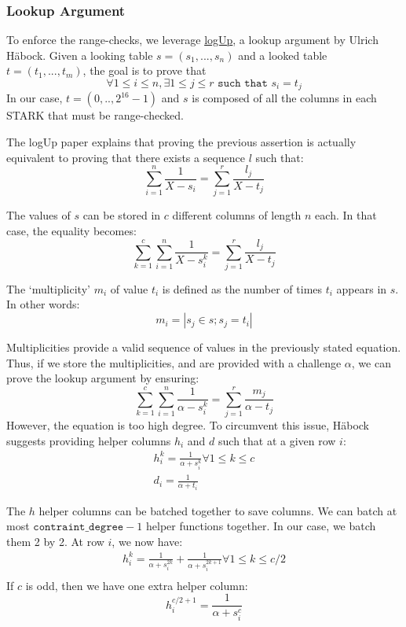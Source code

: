 \subsubsection{Lookup Argument}
To enforce the range-checks, we leverage \href{https://eprint.iacr.org/2022/1530.pdf}{logUp}, a lookup argument by Ulrich Häbock. Given a looking table $s = (s_1, ..., s_n)$ and a looked table $t = (t_1, ..., t_m)$, the goal is to prove that 
$$\forall 1 \leq i \leq n, \exists 1 \leq j \leq r \texttt{ such that } s_i = t_j$$
In our case, $t = (0, .., 2^{16} - 1)$ and $s$ is composed of all the columns in each STARK that must be range-checked. 

The logUp paper explains that proving the previous assertion is actually equivalent to proving that there exists a sequence $l$ such that:
$$ \sum_{i=1}^n \frac{1}{X - s_i} = \sum_{j=1}^r \frac{l_j}{X-t_j}$$

The values of $s$ can be stored in $c$ different columns of length $n$ each. In that case, the equality becomes:
$$\sum_{k=1}^c \sum_{i=1}^n \frac{1}{X - s_i^k} = \sum_{j=1}^r \frac{l_j}{X-t_j}$$

The `multiplicity' $m_i$ of value $t_i$ is defined as the number of times $t_i$ appears in $s$. In other words:
$$m_i = |s_j \in s; s_j = t_i|$$

Multiplicities provide a valid sequence of values in the previously stated equation. Thus, if we store the multiplicities, and are provided with a challenge $\alpha$, we can prove the lookup argument by ensuring:
$$\sum_{k=1}^c \sum_{i=1}^n \frac{1}{\alpha - s_i^k} = \sum_{j=1}^r \frac{m_j}{\alpha-t_j}$$
However, the equation is too high degree. To circumvent this issue, Häbock suggests providing helper columns $h_i$ and $d$ such that at a given row $i$:
\begin{gather*}
  h_i^k = \frac{1}{\alpha + s_i^k } \forall 1 \leq k \leq c \\
  d_i = \frac{1}{\alpha + t_i}
\end{gather*}

The $h$ helper columns can be batched together to save columns. We can batch at most $\texttt{contraint\_degree} - 1$ helper functions together. In our case, we batch them 2 by 2. At row $i$, we now have:
\begin{align*}
  h_i^k = \frac{1}{\alpha + s_i^{2k}} + \frac{1}{\alpha + s_i^{2k+1}} \forall 1 \leq k \leq c/2 \\
\end{align*}
If $c$ is odd, then we have one extra helper column:
$$h_i^{c/2+1} = \frac{1}{\alpha + s_i^{c}}$$

